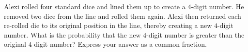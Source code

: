 Alexi rolled four standard dice and lined them up to create a $4$-digit number. He removed two dice from the line and rolled them again. Alexi then returned each re-rolled die to its original position in the line, thereby creating a new $4$-digit number. What is the probability that the new $4$-digit number is greater than the original $4$-digit number? Express your answer as a common fraction.
